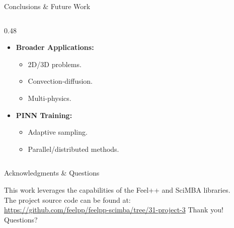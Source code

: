 \documentclass{beamer}
\begin{document}
\begin{frame}{Conclusions \& Future Work}
\begin{columns}[T]
\begin{column}{0.48\textwidth}
\begin{itemize}
\begin{itemize}
            \end{itemize}
        \item \textbf{Broader Applications:}
            \begin{itemize}
                \item 2D/3D problems.
                \item Convection-diffusion.
                \item Multi-physics.
            \end{itemize}
        \item \textbf{PINN Training:}
            \begin{itemize}
                \item Adaptive sampling.
                \item Parallel/distributed methods.
            \end{itemize}
    \end{itemize}
  \end{column}
  \end{columns}
\end{frame}

\begin{frame}{Acknowledgments \& Questions}
  \begin{center}
    This work leverages the capabilities of the Feel++ and SciMBA libraries. \\
    The project source code can be found at: \\ \url{https://github.com/feelpp/feelpp-scimba/tree/31-project-3}
    \vspace{2em}
    \huge Thank you! \\
    \vspace{1em}
    Questions?
  \end{center}
\end{frame}
\end{document}
